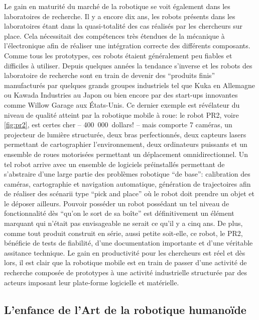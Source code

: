 Le gain en maturité du marché de la robotique se voit également dans
les laboratoires de recherche. Il y a encore dix ans, les robots
présents dans les laboratoires étant dans la quasi-totalité des cas
réalisés par les chercheurs sur place. Cela nécessitait des
compétences très étendues de la mécanique à l'électronique afin de
réaliser une intégration correcte des différents composants. Comme
tous les prototypes, ces robots étaient généralement peu fiables et
difficiles à utiliser. Depuis quelques années la tendance s'inverse et
les robots des laboratoire de recherche sont en train de devenir des
``produits finis'' manufacturés par quelques grands groupes
industriels tel que Kuka en Allemagne ou Kawada Industries au Japon ou
bien encore par des start-ups innovantes comme Willow Garage aux
États-Unis. Ce dernier exemple est révélateur du niveau de qualité
atteint par la robotique mobile à roue: le robot PR2, voire
\autoref{fig:pr2}, est certes cher -- 400 000 dollars! -- mais
comporte 7 caméras, un projecteur de lumière structurée, deux bras
perfectionnés, deux capteurs lasers permettant de cartographier
l'environnement, deux ordinateurs puissants et un ensemble de roues
motorisées permettant un déplacement omnidirectionnel. Un tel robot
arrive avec un ensemble de logiciels préinstallés permettant de
s'abstraire d'une large partie des problèmes robotique ``de base'':
calibration des caméras, cartographie et navigation automatique,
génération de trajectoires afin de réaliser des scénarii type ``pick
and place'' où le robot doit prendre un objet et le déposer
ailleurs. Pouvoir posséder un robot possédant un tel niveau de
fonctionnalité dès ``qu'on le sort de sa boîte'' est définitivement un
élément marquant qui n'était pas envisageable ne serait ce qu'il y a
cinq ans. De plus, comme tout produit construit en série, aussi petite
soit-elle, ce robot, le PR2, bénéficie de tests de
fiabilité, d'une documentation importante et d'une véritable assitance
technique. Le gain en productivité pour les chercheurs est réel et dès
lors, il est clair que la robotique mobile est en train de passer
d'une activité de recherche composée de prototypes à une activité
industrielle structurée par des acteurs imposant leur plate-forme
logicielle et matérielle.



\subsection{L'enfance de l'Art de la robotique humanoïde}


